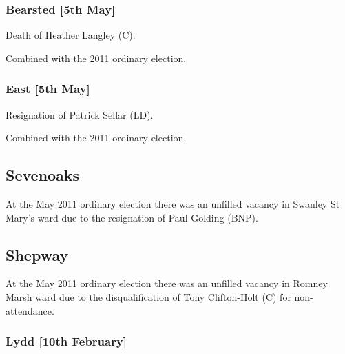 \begin{resultsiii}
\subsubsection*{Bearsted \hspace*{\fill}\nolinebreak[1]%
\enspace\hspace*{\fill}
[5th May]}


Death of Heather Langley (C).

Combined with the 2011 ordinary election.

\subsubsection*{East \hspace*{\fill}\nolinebreak[1]%
\enspace\hspace*{\fill}
[5th May]}


Resignation of Patrick Sellar (LD).

Combined with the 2011 ordinary election.

\subsection*{Sevenoaks}


At the May 2011 ordinary election there was an unfilled vacancy in Swanley St Mary's ward due to the resignation of Paul Golding (BNP).

\subsection*{Shepway}


At the May 2011 ordinary election there was an unfilled vacancy in Romney Marsh ward due to the disqualification of Tony Clifton-Holt (C) for non-attendance.

\subsubsection*{Lydd \hspace*{\fill}\nolinebreak[1]%
\enspace\hspace*{\fill}
[10th February]}


\end{resultsiii}
